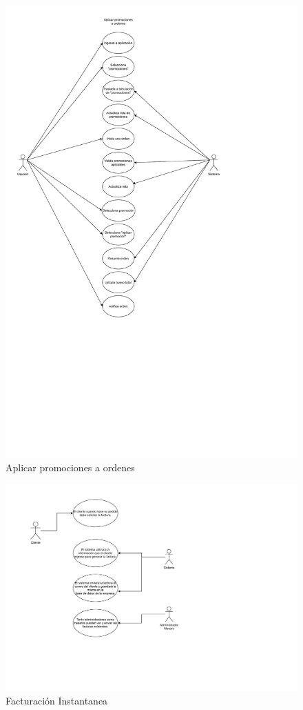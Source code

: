 \documentclass[conference]{IEEEtran}
\begin{document}
\begin{figure}[H]
\centering
\includegraphics[scale=0.24]{imagenes/DCU Aplicar promociones a ordenes3.pdf}
\caption{Aplicar promociones a ordenes}
\end{figure}

\begin{figure}[H]
\centering
\includegraphics[scale=0.24]{imagenes/Diagrama_requerimiento4 (1).pdf}
\caption{Facturación Instantanea}
\end{figure}
\end{document}
